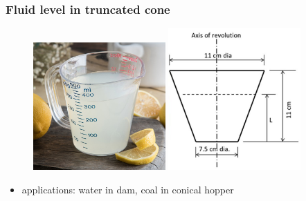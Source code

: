 \documentclass[english,14pt]{beamer}
\begin{document}

\begin{frame}[fragile]

\frametitle{Fluid level in truncated cone}

\vspace*{-3mm}
\begin{figure}[ht]
	\centering
	\includegraphics[width=0.45\textwidth]{figures/measuringCup}\hspace*{2mm}%
	\includegraphics[width=0.45\textwidth]{figures/cupDimensions}
\end{figure}

\begin{itemize}
	\item applications: water in dam, coal in conical hopper
\end{itemize}

\end{frame}

\end{document}
